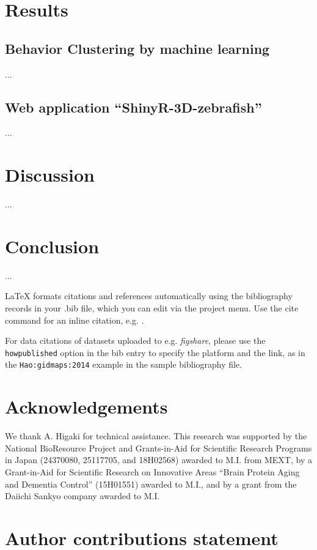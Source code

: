 \documentclass[fleqn,10pt]{wlscirep}
\begin{document}
\section*{Results}

\subsection*{Behavior Clustering by machine learning}

...
\subsection*{Web application “ShinyR-3D-zebrafish”}
...

\section*{Discussion}
...

\section*{Conclusion}
...


\noindent LaTeX formats citations and references automatically using the bibliography records in your .bib file, which you can edit via the project menu. Use the cite command for an inline citation, e.g.  \cite{Hao:gidmaps:2014}.

For data citations of datasets uploaded to e.g. \emph{figshare}, please use the \verb|howpublished| option in the bib entry to specify the platform and the link, as in the \verb|Hao:gidmaps:2014| example in the sample bibliography file.

\section*{Acknowledgements}

We thank A. Higaki for technical assistance. This research was supported by the National BioResource Project and Grants-in-Aid for Scientific Research Programs in Japan (24370080, 25117705, and 18H02568) awarded to M.I. from MEXT, by a Grant-in-Aid for Scientific Research on Innovative Areas “Brain Protein Aging and Dementia Control” (15H01551) awarded to M.I., and by a grant from the Daiichi Sankyo company awarded to M.I.

\section*{Author contributions statement}
\end{document}
